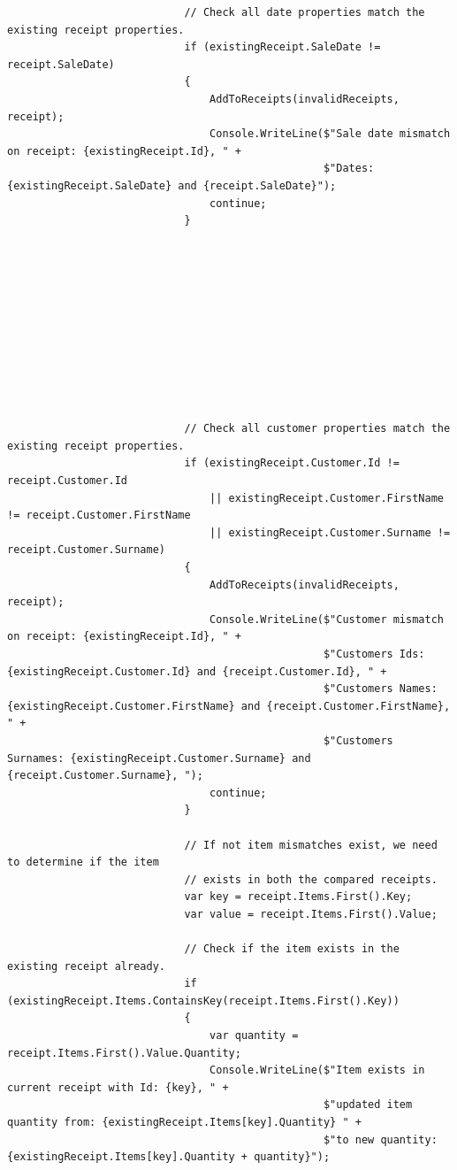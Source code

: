 \documentclass{article}
\begin{document}
\begin{lstlisting}
                            // Check all date properties match the existing receipt properties.
                            if (existingReceipt.SaleDate != receipt.SaleDate)
                            {
                                AddToReceipts(invalidReceipts, receipt);
                                Console.WriteLine($"Sale date mismatch on receipt: {existingReceipt.Id}, " +
                                                  $"Dates: {existingReceipt.SaleDate} and {receipt.SaleDate}");
                                continue;
                            }











                            // Check all customer properties match the existing receipt properties.
                            if (existingReceipt.Customer.Id != receipt.Customer.Id
                                || existingReceipt.Customer.FirstName != receipt.Customer.FirstName
                                || existingReceipt.Customer.Surname != receipt.Customer.Surname)
                            {
                                AddToReceipts(invalidReceipts, receipt);
                                Console.WriteLine($"Customer mismatch on receipt: {existingReceipt.Id}, " +
                                                  $"Customers Ids: {existingReceipt.Customer.Id} and {receipt.Customer.Id}, " +
                                                  $"Customers Names: {existingReceipt.Customer.FirstName} and {receipt.Customer.FirstName}, " +
                                                  $"Customers Surnames: {existingReceipt.Customer.Surname} and {receipt.Customer.Surname}, ");
                                continue;
                            }

                            // If not item mismatches exist, we need to determine if the item 
                            // exists in both the compared receipts.
                            var key = receipt.Items.First().Key;
                            var value = receipt.Items.First().Value;

                            // Check if the item exists in the existing receipt already.
                            if (existingReceipt.Items.ContainsKey(receipt.Items.First().Key))
                            {
                                var quantity = receipt.Items.First().Value.Quantity;
                                Console.WriteLine($"Item exists in current receipt with Id: {key}, " +
                                                  $"updated item quantity from: {existingReceipt.Items[key].Quantity} " +
                                                  $"to new quantity: {existingReceipt.Items[key].Quantity + quantity}");


\end{lstlisting}
\end{document}
